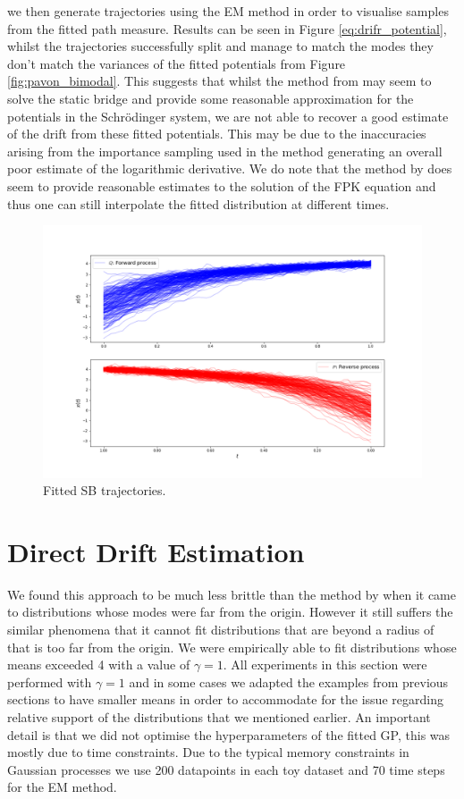 \documentclass[a4paper,12pt,twoside,openright]{report}
\theoremstyle{definition}
\begin{document}
we then generate trajectories using the EM method in order to visualise samples from the fitted path measure. Results can be seen in Figure \ref{eq:drifr_potential}, whilst the trajectories successfully split and manage to match the modes they don't match the variances of the fitted potentials from Figure \ref{fig:pavon_bimodal}. This suggests that whilst the method from \cite{pavon2018data} may seem to solve the static bridge and provide some reasonable approximation for the potentials in the Schrödinger system, we are not able to recover a good estimate of the drift from these fitted potentials. This may be due to the inaccuracies arising from the importance sampling used in the method generating an overall poor estimate of the logarithmic derivative. We do note that the method by \cite{pavon1991free} does seem to provide reasonable estimates to the solution of the FPK equation and thus one can still interpolate the fitted distribution at different times.

\begin{figure}[t]
    \centering
    \includegraphics[scale=0.4,trim={2.3cm 1cm 2.5cm 0}, clip]{images/GP/gp_bigvar_trajectories.png}
    \caption{ Fitted SB trajectories.  }
    \label{fig:bigvar200trajectroies}
\end{figure}
\section{Direct Drift Estimation}

We found this approach to be much less brittle than the method by \cite{pavon2018data} when it came to distributions whose modes were far from the origin. However it still suffers the similar phenomena that it cannot fit distributions that are beyond a radius of that is too far from the origin. We were empirically able to fit distributions whose means exceeded 4 with a value of $\gamma=1$. All experiments in this section were performed with $\gamma=1$ and in some cases we adapted the examples from previous sections to have smaller means in order to accommodate for the issue regarding relative support of the distributions that we mentioned earlier. An important detail is that we did not optimise the hyperparameters of the fitted GP, this was mostly due to time constraints. Due to the typical memory constraints in Gaussian processes we use 200 datapoints in each toy dataset and 70 time steps for the EM method.
\end{document}
